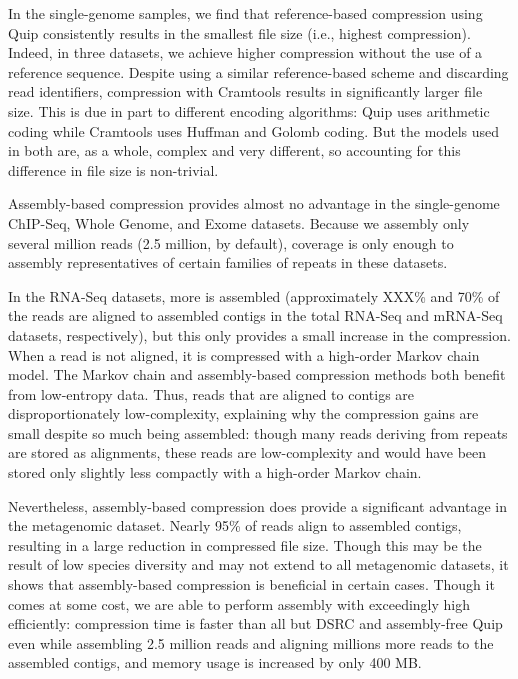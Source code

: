 \documentclass[twocolumn]{article}
\begin{document}
In the single-genome samples, we find that reference-based compression using
Quip consistently results in the smallest file size (i.e., highest
compression). Indeed, in three datasets, we achieve higher compression without
the use of a reference sequence. Despite using a similar reference-based
scheme and discarding read identifiers, compression with Cramtools results in
significantly larger file size. This is due in part to different encoding
algorithms: Quip uses arithmetic coding while Cramtools uses Huffman and
Golomb coding. But the models used in both are, as a whole, complex and very
different, so accounting for this difference in file size is non-trivial.

Assembly-based compression provides almost no advantage in the single-genome
ChIP-Seq, Whole Genome, and Exome datasets. Because we assembly only several
million reads (2.5 million, by default), coverage is only enough to assembly
representatives of certain families of repeats in these datasets.

In the RNA-Seq datasets, more is assembled (approximately XXX\% and 70\% of
the reads are aligned to assembled contigs in the total RNA-Seq and mRNA-Seq
datasets, respectively), but this only provides a small increase in the
compression. When a read is not aligned, it is compressed with a high-order
Markov chain model. The Markov chain and assembly-based compression methods
both benefit from low-entropy data. Thus, reads that are aligned to contigs
are disproportionately low-complexity, explaining why the compression gains
are small despite so much being assembled: though many reads deriving from
repeats are stored as alignments, these reads are low-complexity and would
have been stored only slightly less compactly with a high-order Markov chain.

Nevertheless, assembly-based compression does provide a significant advantage
in the metagenomic dataset. Nearly 95\% of reads align to assembled contigs,
resulting in a large reduction in compressed file size. Though this may be the
result of low species diversity and may not extend to all metagenomic
datasets, it shows that assembly-based compression is beneficial in certain
cases. Though it comes at some cost, we are able to perform assembly with
exceedingly  high efficiently: compression time is faster than all but DSRC
and assembly-free Quip even while assembling 2.5 million reads and aligning
millions more reads to the assembled contigs, and memory usage is increased by
only 400 MB.
\end{document}
